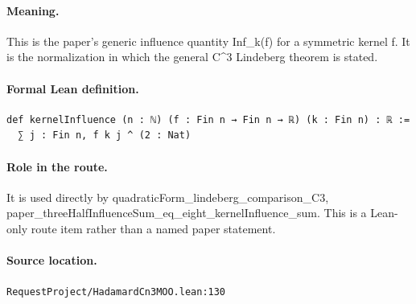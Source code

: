 \medskip
\paragraph{Meaning.}
This is the paper's generic influence quantity Inf\_k(f) for a symmetric kernel f. It is the normalization in which the general C^3 Lindeberg theorem is stated.
\paragraph{Formal Lean definition.}
\begin{verbatim}
def kernelInfluence (n : ℕ) (f : Fin n → Fin n → ℝ) (k : Fin n) : ℝ :=
  ∑ j : Fin n, f k j ^ (2 : Nat)
\end{verbatim}
\paragraph{Role in the route.}
It is used directly by quadraticForm\_lindeberg\_comparison\_C3, paper\_threeHalfInfluenceSum\_eq\_eight\_kernelInfluence\_sum. This is a Lean-only route item rather than a named paper statement.
\paragraph{Source location.}
\texttt{RequestProject/HadamardCn3MOO.lean:130}
\medskip
